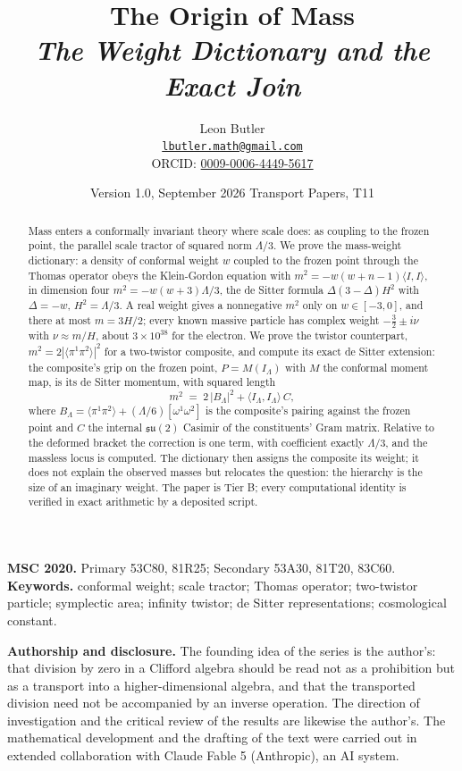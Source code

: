 \documentclass[11pt]{article}
\title{\bfseries The Origin of Mass\\[4pt]
  \large\itshape The Weight Dictionary and the Exact Join}
\author{Leon Butler\\ \normalsize\href{mailto:lbutler.math@gmail.com}{\texttt{lbutler.math@gmail.com}}\\ \normalsize ORCID: \href{https://orcid.org/0009-0006-4449-5617}{0009-0006-4449-5617}}
\date{Version 1.0, September 2026 \textperiodcentered{} Transport Papers, T11}
\theoremstyle{definition}
\newcommand{\ip}[2]{\langle #1, #2\rangle}
\newcommand{\br}[1]{\langle #1\rangle}
\begin{document}
\maketitle

\begin{abstract}
\normalsize
Mass enters a conformally invariant theory where scale does: as coupling to the frozen point, the parallel scale tractor of squared norm $\Lambda/3$. We prove the mass-weight dictionary: a density of conformal weight $w$ coupled to the frozen point through the Thomas operator obeys the Klein-Gordon equation with $m^{2} = -w(w+n-1)\ip{I}{I}$, in dimension four $m^{2} = -w(w+3)\Lambda/3$, the de Sitter formula $\Delta(3-\Delta)H^{2}$ with $\Delta = -w$, $H^{2} = \Lambda/3$. A real weight gives a nonnegative $m^{2}$ only on $w \in [-3,0]$, and there at most $m = 3H/2$; every known massive particle has complex weight $-\tfrac32 \pm i\nu$ with $\nu \approx m/H$, about $3 \times 10^{38}$ for the electron. We prove the twistor counterpart, $m^{2} = 2|\br{\pi^{1}\pi^{2}}|^{2}$ for a two-twistor composite, and compute its exact de Sitter extension: the composite's grip on the frozen point, $P = M(I_{\Lambda})$ with $M$ the conformal moment map, is its de Sitter momentum, with squared length
\[
m^{2} \;=\; 2\,|B_{\Lambda}|^{2} + \ip{I_{\Lambda}}{I_{\Lambda}}\, C,
\]
where $B_{\Lambda} = \br{\pi^{1}\pi^{2}} + (\Lambda/6)[\omega^{1}\omega^{2}]$ is the composite's pairing against the frozen point and $C$ the internal $\mathfrak{su}(2)$ Casimir of the constituents' Gram matrix. Relative to the deformed bracket the correction is one term, with coefficient exactly $\Lambda/3$, and the massless locus is computed. The dictionary then assigns the composite its weight; it does not explain the observed masses but relocates the question: the hierarchy is the size of an imaginary weight. The paper is Tier B; every computational identity is verified in exact arithmetic by a deposited script.
\end{abstract}

\medskip
\noindent\textbf{MSC 2020.} Primary 53C80, 81R25; Secondary 53A30, 81T20, 83C60.\\
\textbf{Keywords.} conformal weight; scale tractor; Thomas operator; two-twistor particle; symplectic area; infinity twistor; de Sitter representations; cosmological constant.

\newpage
\textbf{Authorship and disclosure. }The founding idea of the series is the author's: that division by zero in a Clifford algebra should be read not as a prohibition but as a transport into a higher-dimensional algebra, and that the transported division need not be accompanied by an inverse operation. The direction of investigation and the critical review of the results are likewise the author's. The mathematical development and the drafting of the text were carried out in extended collaboration with Claude Fable 5 (Anthropic), an AI system.
\end{document}
